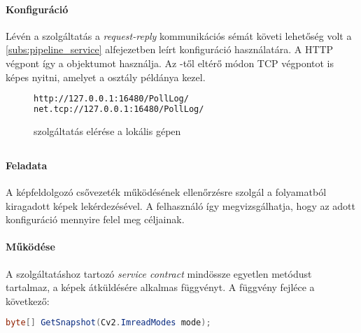 \paragraph{Konfiguráció} Lévén a szolgáltatás a \emph{request-reply} kommunikációs sémát követi lehetőség volt a \ref{subs:pipeline_service} alfejezetben leírt konfiguráció használatára. A HTTP végpont így a  objektumot használja. Az -től eltérő módon TCP végpontot is képes nyitni, amelyet a  osztály példánya kezel.

\begin{figure}[h]
\centering
\begin{minipage}{1\textwidth}
\begin{mdframed}[backgroundcolor=gray!20]
\begin{normalsize}
\begin{lstlisting}[language=XML]
http://127.0.0.1:16480/PollLog/
net.tcp://127.0.0.1:16480/PollLog/
\end{lstlisting}
\end{normalsize}
\end{mdframed}
\end{minipage}
\caption{ szolgáltatás elérése a lokális gépen}
\end{figure}

\subsection{}
\paragraph{Feladata}
A képfeldolgozó csővezeték működésének ellenőrzésre szolgál a folyamatból kiragadott képek lekérdezésével. A felhasználó így megvizsgálhatja, hogy az adott konfiguráció mennyire felel meg céljainak. 

\paragraph{Működése}
A szolgáltatáshoz tartozó \emph{service contract} mindössze egyetlen metódust tartalmaz, a képek átküldésére alkalmas  függvényt. A függvény fejléce a következő:
\begin{mdframed}[backgroundcolor=gray!20]
\begin{small}
\begin{lstlisting}[language=java]
byte[] GetSnapshot(Cv2.ImreadModes mode);
\end{lstlisting}
\end{small}
\end{mdframed}

